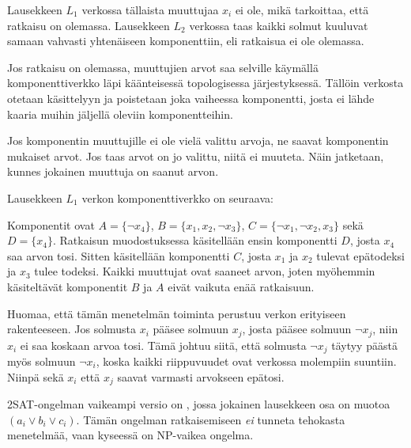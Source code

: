 Lausekkeen $L_1$ verkossa tällaista
muuttujaa $x_i$ ei ole,
mikä tarkoittaa, että ratkaisu on olemassa.
Lausekkeen $L_2$ verkossa taas kaikki solmut
kuuluvat samaan vahvasti yhtenäiseen komponenttiin,
eli ratkaisua ei ole olemassa.

Jos ratkaisu on olemassa, muuttujien arvot saa selville
käymällä komponenttiverkko läpi käänteisessä
topologisessa järjestyksessä.
Tällöin verkosta otetaan käsittelyyn ja poistetaan
joka vaiheessa komponentti,
josta ei lähde kaaria muihin jäljellä
oleviin komponentteihin.

Jos komponentin muuttujille ei ole vielä valittu arvoja,
ne saavat komponentin mukaiset arvot.
Jos taas arvot on jo valittu, niitä ei muuteta.
Näin jatketaan, kunnes jokainen muuttuja on saanut arvon.

Lausekkeen $L_1$ verkon komponenttiverkko on seuraava:
\\
\begin{center}
\end{center}

Komponentit ovat
$A = \{\lnot x_4\}$,
$B = \{x_1, x_2, \lnot x_3\}$,
$C = \{\lnot x_1, \lnot x_2, x_3\}$ sekä
$D = \{x_4\}$.
Ratkaisun muodostuksessa
käsitellään ensin komponentti $D$,
josta $x_4$ saa arvon tosi.
Sitten käsitellään komponentti $C$,
josta $x_1$ ja $x_2$ tulevat epätodeksi
ja $x_3$ tulee todeksi.
Kaikki muuttujat ovat saaneet arvon,
joten myöhemmin käsiteltävät
komponentit $B$ ja $A$ eivät vaikuta enää ratkaisuun.

Huomaa, että tämän menetelmän toiminta
perustuu verkon erityiseen rakenteeseen.
Jos solmusta $x_i$ pääsee
solmuun $x_j$,
josta pääsee solmuun $\lnot x_j$,
niin $x_i$ ei saa koskaan arvoa tosi.
Tämä johtuu siitä, että
solmusta $\lnot x_j$ täytyy
päästä myös solmuun $\lnot x_i$,
koska kaikki riippuvuudet
ovat verkossa molempiin suuntiin.
Niinpä sekä $x_i$ että $x_j$
saavat varmasti arvokseen epätosi.


2SAT-ongelman vaikeampi versio on ,
jossa jokainen lausekkeen osa on muotoa
$(a_i \lor b_i \lor c_i)$.
Tämän ongelman ratkaisemiseen \textit{ei}
tunneta tehokasta menetelmää,
vaan kyseessä on NP-vaikea ongelma.


